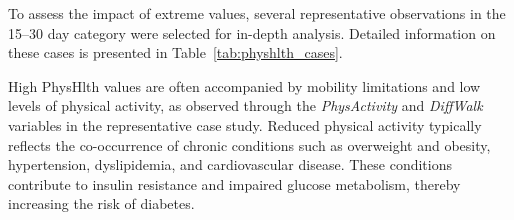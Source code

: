 To assess the impact of extreme values, several representative observations in the 15–30 day category were selected for in-depth analysis. Detailed information on these cases is presented in Table~\ref{tab:physhlth_cases}.
\begin{table}[H]
\centering
\caption{Selected diabetic individuals with high PhysHlth values (case studies)}
\label{tab:physhlth_cases}

\scriptsize
\setlength{\tabcolsep}{4pt}
\renewcommand{\arraystretch}{1.1}

\end{table}

High PhysHlth values are often accompanied by mobility limitations and low levels of physical activity, as observed through the \textit{PhysActivity} and \textit{DiffWalk} variables in the representative case study. Reduced physical activity typically reflects the co-occurrence of chronic conditions such as overweight and obesity, hypertension, dyslipidemia, and cardiovascular disease. These conditions contribute to insulin resistance and impaired glucose metabolism, thereby increasing the risk of diabetes.

